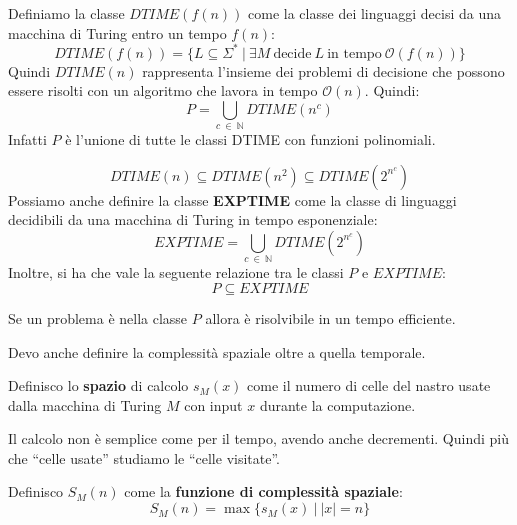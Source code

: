 \begin{definizione}
    Definiamo la classe $DTIME(f(n))$ come la classe dei linguaggi decisi da una
    macchina di Turing entro un tempo $f(n)$:
    \begin{equation}
        DTIME(f(n)) = \{L \subseteq \Sigma^{\ast} \ | \ \exists M \ \text{decide} \ L \ \text{in tempo} \ \mathcal{O}(f(n)) \}
    \end{equation}
    Quindi $DTIME(n)$ rappresenta l'insieme dei problemi di decisione che possono
    essere risolti con un algoritmo che lavora in tempo $\mathcal{O}(n)$. Quindi:
    \begin{equation}
        P = \bigcup_{c \ \in \ \mathbb{N}} DTIME(n^c)
    \end{equation}
    Infatti $P$ è l'unione di tutte le classi DTIME con funzioni polinomiali.
\end{definizione}
\begin{equation}
    DTIME(n) \subseteq DTIME(n^2) \subseteq DTIME(2^{n^c})
\end{equation}
Possiamo anche definire la classe \textbf{EXPTIME} come la classe di linguaggi
decidibili da una macchina di Turing in tempo esponenziale:
\begin{equation}
    EXPTIME =  \bigcup_{c \ \in \ \mathbb{N}} DTIME(2^{n^c})
\end{equation}
Inoltre, si ha che vale la seguente relazione tra le classi $P$ e $EXPTIME$:
\begin{equation}
    P \subseteq EXPTIME
\end{equation}
\begin{teorema}
    Se un problema è nella classe $P$ allora è risolvibile in un tempo efficiente.
\end{teorema}
Devo anche definire la complessità spaziale oltre a quella temporale.
\begin{definizione}
    Definisco lo \textbf{spazio} di calcolo $s_M(x)$ come il numero di celle del
    nastro usate dalla macchina di Turing $M$ con input $x$ durante la computazione.

    Il calcolo non è semplice come per il tempo, avendo anche decrementi. Quindi
    più che “celle usate” studiamo le “celle visitate”.
\end{definizione}
\begin{definizione}
    Definisco $S_M(n)$ come la \textbf{funzione di complessità spaziale}:
    \begin{equation}
        S_M(n) =  \max\{s_M(x)\ |\  |x| = n\}
    \end{equation}
\end{definizione}
